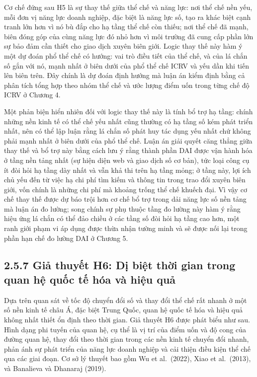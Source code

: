 \documentclass[
  a4paper,
  13pt]{extreport}
\begin{document}
Cơ chế đứng sau H5 là sự thay thế giữa thể chế và năng lực: nơi thể chế
nền yếu, mỗi đơn vị năng lực doanh nghiệp, đặc biệt là năng lực số, tạo
ra khác biệt cạnh tranh lớn hơn vì nó bù đắp cho hạ tầng thể chế còn
thiếu; nơi thể chế đã mạnh, biên đóng góp của cùng năng lực đó nhỏ hơn
vì môi trường đã cung cấp phần lớn sự bảo đảm cần thiết cho giao dịch
xuyên biên giới. Logic thay thế này hàm ý một dự đoán phổ thể chế có
hướng: vai trò điều tiết của thể chế, và của lá chắn số gắn với nó, mạnh
nhất ở biên dưới của phổ thể chế ICRV và yếu dần khi tiến lên biên trên.
Đây chính là dự đoán định hướng mà luận án kiểm định bằng cả phân tích
tổng hợp theo nhóm thể chế và ước lượng điểm uốn trong từng chế độ ICRV
ở Chương 4.

Một phản biện hiển nhiên đối với logic thay thế này là tính bổ trợ hạ
tầng: chính những nền kinh tế có thể chế yếu nhất cũng thường có hạ tầng
số kém phát triển nhất, nên có thể lập luận rằng lá chắn số phát huy tác
dụng yếu nhất chứ không phải mạnh nhất ở biên dưới của phổ thể chế. Luận
án giải quyết căng thẳng giữa thay thế và bổ trợ này bằng cách lưu ý
rằng thành phần DAI được vận hành hóa ở tầng nền tảng nhất (sự hiện diện
web và giao dịch số cơ bản), tức loại công cụ ít đòi hỏi hạ tầng dày
nhất và vẫn khả thi trên hạ tầng mỏng; ở tầng này, lợi ích chủ yếu đến
từ việc hạ chi phí tìm kiếm và thông tin trong trao đổi xuyên biên giới,
vốn chính là những chi phí mà khoảng trống thể chế khuếch đại. Vì vậy cơ
chế thay thế được dự báo trội hơn cơ chế bổ trợ trong dải năng lực số
nền tảng mà luận án đo lường; song chính sự phụ thuộc tầng đo lường này
hàm ý rằng hiệu ứng lá chắn có thể đảo chiều ở các tầng số đòi hỏi hạ
tầng cao hơn, một ranh giới phạm vi áp dụng được thừa nhận tường minh và
sẽ được nối lại trong phần hạn chế đo lường DAI ở Chương 5.

\hypertarget{giux1ea3-thuyux1ebft-h6-dux1ecb-biux1ec7t-thux1eddi-gian-trong-quan-hux1ec7-quux1ed1c-tux1ebf-huxf3a-vuxe0-hiux1ec7u-quux1ea3}{%
\subsection{2.5.7 Giả thuyết H6: Dị biệt thời gian trong quan hệ quốc tế
hóa và hiệu
quả}\label{giux1ea3-thuyux1ebft-h6-dux1ecb-biux1ec7t-thux1eddi-gian-trong-quan-hux1ec7-quux1ed1c-tux1ebf-huxf3a-vuxe0-hiux1ec7u-quux1ea3}}

Dựa trên quan sát về tốc độ chuyển đổi số và thay đổi thể chế rất nhanh
ở một số nền kinh tế châu Á, đặc biệt Trung Quốc, quan hệ quốc tế hóa và
hiệu quả không nhất thiết ổn định theo thời gian. Giả thuyết H6 được
phát biểu như sau. Hình dạng phi tuyến của quan hệ, cụ thể là vị trí của
điểm uốn và độ cong của đường quan hệ, thay đổi theo thời gian trong các
nền kinh tế chuyển đổi nhanh, phản ánh sự phát triển của năng lực doanh
nghiệp và cải thiện điều kiện thể chế qua các giai đoạn. Cơ sở lý thuyết
bao gồm Wu et al.~(2022), Xiao et al.~(2013), và Banalieva và Dhanaraj
(2019).
\end{document}
